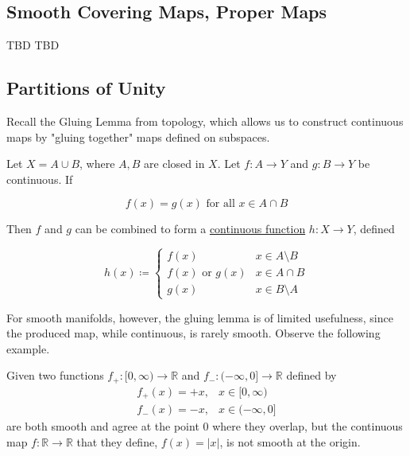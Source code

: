 \documentclass{article}
\newcounter{example}[section]
\begin{document}
  \subsection{Smooth Covering Maps, Proper Maps}

    TBD
    TBD

  \subsection{Partitions of Unity}

    Recall the Gluing Lemma from topology, which allows us to construct continuous maps by "gluing together" maps defined on subspaces. 

    \begin{lemma}
      \label{thm:pasting-lemma-gluing-lemma}
      Let $X = A \cup B$, where $A, B$ are closed in $X$. Let $f: A \to Y$ and $g: B \to Y$ be continuous. If 

        \begin{equation}
          f(x) = g(x) \text{ for all } x \in A \cap B
        \end{equation}

      Then $f$ and $g$ can be combined to form a \hyperref[pst-def:continuous_func]{continuous function} $h: X \to Y$, defined

        \begin{equation}
          h(x) \coloneqq \begin{cases}
                      f(x) & x \in A \setminus B \\
                      f(x) \text{ or } g(x) & x \in A \cap B \\
                      g(x) & x \in B \setminus A
                  \end{cases}
        \end{equation}
    \end{lemma}

    For smooth manifolds, however, the gluing lemma is of limited usefulness, since the produced map, while continuous, is rarely smooth. Observe the following example. 

    \begin{example}
      \label{ex:gluing-one-sided-functions}
      Given two functions $f_+: [0, \infty) \to \mathbb{R}$ and $f_-: (-\infty, 0] \to \mathbb{R}$ defined by 
      \begin{align*}
        f_+(x) = + x, & x \in [0, \infty) \\
        f_-(x) = - x, & x \in (-\infty, 0]
      \end{align*}
      are both smooth and agree at the point $0$ where they overlap, but the continuous map $f: \mathbb{R} \to \mathbb{R}$ that they define, $f(x) = |x|$, is not smooth at the origin. 
    \end{example}
\end{document}
